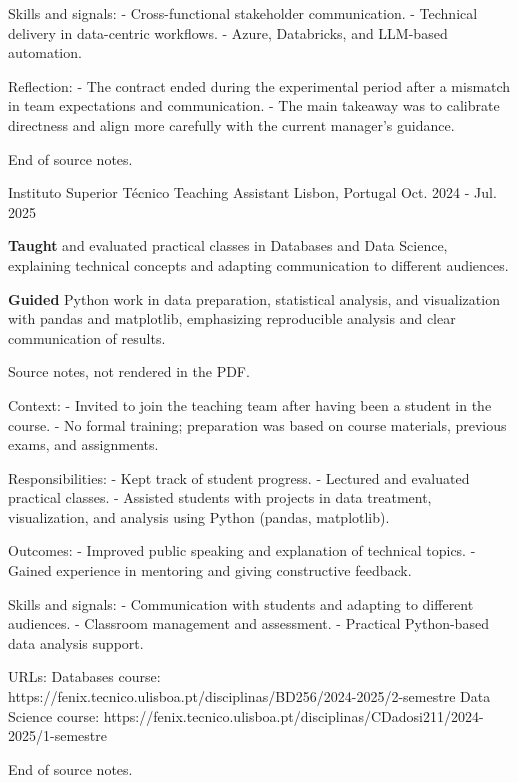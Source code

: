 \begin{cventries}
{      Skills and signals:
      - Cross-functional stakeholder communication.
      - Technical delivery in data-centric workflows.
      - Azure, Databricks, and LLM-based automation.

      Reflection:
      - The contract ended during the experimental period after a mismatch in team expectations and communication.
      - The main takeaway was to calibrate directness and align more carefully with the current manager's guidance.

      End of source notes.
    } %

  \cventry
    {Instituto Superior Técnico} %
    {Teaching Assistant} %
    {Lisbon, Portugal} %
    {Oct. 2024 - Jul. 2025} %
    {
      \begin{cvitems} %
        \item {\textbf{Taught} and evaluated practical classes in Databases and Data Science, explaining technical concepts and adapting communication to different audiences.}
        \item {\textbf{Guided} Python work in data preparation, statistical analysis, and visualization with pandas and matplotlib, emphasizing reproducible analysis and clear communication of results.}
      \end{cvitems}
    } %
    {
      Source notes, not rendered in the PDF.

      Context:
      - Invited to join the teaching team after having been a student in the course.
      - No formal training; preparation was based on course materials, previous exams, and assignments.

      Responsibilities:
      - Kept track of student progress.
      - Lectured and evaluated practical classes.
      - Assisted students with projects in data treatment, visualization, and analysis using Python (pandas, matplotlib).

      Outcomes:
      - Improved public speaking and explanation of technical topics.
      - Gained experience in mentoring and giving constructive feedback.

      Skills and signals:
      - Communication with students and adapting to different audiences.
      - Classroom management and assessment.
      - Practical Python-based data analysis support.

      URLs:
      Databases course: https://fenix.tecnico.ulisboa.pt/disciplinas/BD256/2024-2025/2-semestre
      Data Science course: https://fenix.tecnico.ulisboa.pt/disciplinas/CDadosi211/2024-2025/1-semestre

      End of source notes.
    } %
\end{cventries}
